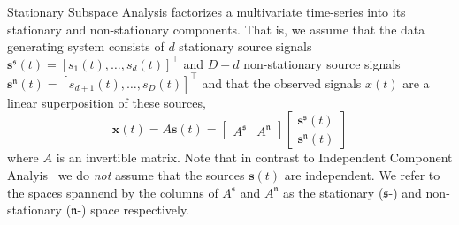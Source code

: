 \documentclass{article}
\newcommand{\1}{\ensuremath{\mathds{1}}}
\newcommand{\s}{\ensuremath{\mathfrak{s}}}
\newcommand{\n}{\ensuremath{\mathfrak{n}}}
\newcommand{\0}{\ensuremath{0}}
\begin{document}
Stationary Subspace Analysis \cite{PRL:SSA:2009} factorizes a multivariate time-series 
into its stationary and non-stationary components. That is, we assume that the data 
generating system consists of $d$ stationary source signals 
${\mathbf s^\s}(t) = [s_1(t), \dots, s_d(t)]^\top$ and $D-d$ non-stationary source signals
${\mathbf s^\n}(t) = [s_{d+1}(t), \dots, s_D(t)]^\top$ and that the observed signals 
$x(t)$ are a linear superposition of these sources,
\begin{equation}
  {\mathbf x}(t) = A {\mathbf s}(t) = 
    \begin{bmatrix} A^{\s} & A^{\n} \end{bmatrix}
    \begin{bmatrix} {\mathbf s^{\s}}(t) \\ {\mathbf s^{\n}}(t) \end{bmatrix}
\label{eq:mixing_model}
\end{equation}
where $A$ is an invertible matrix. Note that in contrast to 
Independent Component Analyis~\cite{ICABook} we do \textit{not} assume that 
the sources ${\mathbf s}(t)$ are independent. We refer to the spaces spannend 
by the columns of $A^{\s}$ and $A^{\n}$ as the stationary ($\s$-) and 
non-stationary ($\n$-) space respectively.  
\end{document}
